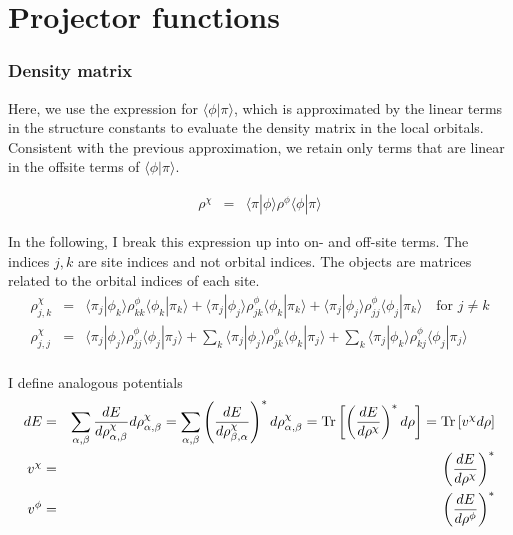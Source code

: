 \documentclass[11pt,a4paper]{report}
\begin{document}
\section{Projector functions}





\subsubsection{Density matrix}
Here, we use the expression for $\langle\phi|\pi\rangle$, which is
approximated by the linear terms in the structure constants to
evaluate the density matrix in the local orbitals. Consistent with the
previous approximation, we retain only terms that are linear in the
offsite terms of $\langle\phi|\pi\rangle$.

\begin{eqnarray}
\rho^\chi&=&\langle\pi|\phi\rangle\rho^\phi\langle\phi|\pi\rangle
\end{eqnarray}

In the following, I break this expression up into on- and off-site terms.
The indices $j,k$ are site indices and not orbital indices. The
objects are matrices related to the orbital indices of each site.
\begin{eqnarray}
\rho^\chi_{j,k}
&=&\langle\pi_j|\phi_k\rangle\rho^\phi_{kk}\langle\phi_k|\pi_k\rangle
+\langle\pi_j|\phi_j\rangle\rho^\phi_{jk}\langle\phi_k|\pi_k\rangle
+\langle\pi_j|\phi_j\rangle\rho^\phi_{jj}\langle\phi_j|\pi_k\rangle
\quad\text{for $j\neq k$}
\nonumber\\
\rho^\chi_{j,j}
&=&\langle\pi_j|\phi_j\rangle\rho^\phi_{jj}\langle\phi_j|\pi_j\rangle
+\sum_k\langle\pi_j|\phi_j\rangle\rho^\phi_{jk}\langle\phi_k|\pi_j\rangle
+\sum_k\langle\pi_j|\phi_k\rangle\rho^\phi_{kj}\langle\phi_j|\pi_j\rangle
\nonumber\\
\end{eqnarray}

I define analogous potentials
\begin{eqnarray}
dE&=&
\sum_{\alpha,\beta}
\frac{dE}{d\rho^\chi_{\alpha,\beta}}d\rho^{\chi}_{\alpha,\beta}
=\sum_{\alpha,\beta}
\left(\frac{dE}{d\rho^\chi_{\beta,\alpha}}\right)^* d\rho^{\chi}_{\alpha,\beta}
=\mathrm{Tr}\left[\left(\frac{dE}{d\rho^\chi}\right)^* d\rho\right]
=\mathrm{Tr}\left[v^\chi d\rho\right]
\nonumber\\
v^\chi&=&\left(\frac{dE}{d\rho^\chi}\right)^*
\nonumber\\
v^\phi&=&\left(\frac{dE}{d\rho^\phi}\right)^*
\end{eqnarray}
\end{document}
